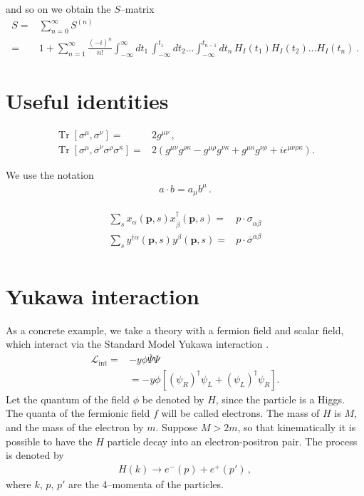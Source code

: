 and so on we obtain the $S$--matrix
\begin{align}
  S=&\sum_{n=0}^\infty S^{(n)}\nonumber\\
  =&1+\sum_{n=1}^\infty\frac{(-i)^n}{n!}\int_{-\infty}^{\infty}d t_1\,\int_{-\infty}^{t_1} d t_2\ldots\int_{-\infty}^{t_{n-1}}d t_n\,{H}_I(t_1){H}_I(t_2)\ldots{H}_I(t_n)\,.
\end{align}

\section{Useful identities}
\begin{align} %
  \label{eq:trss}
  \operatorname{Tr}\left[ \sigma^{\mu},\sigma^{\nu} \right]=&2 g^{\mu\nu}\,, \\
  \operatorname{Tr}\left[ \sigma^{\mu},\overline{\sigma}^{\nu}\sigma^{\rho}\sigma^{\kappa} \right]=&
   2 \left(g^{\mu\nu}g^{\rho\kappa}-g^{\mu\rho}g^{\nu\kappa}+g^{\mu\kappa}g^{\nu\rho} +i\epsilon^{\mu\nu\rho\kappa} \right).
\end{align}


We use the notation
\begin{align}
  a\cdot b=a_{\mu}b^{\mu}\,.
\end{align}

\begin{align}
\label{eq:xxd}
  \sum_s x_{\alpha}(\mathbf{p},s)x^{\dagger}_{\dot{\beta}}(\mathbf{p},s)=&p\cdot \sigma_{\alpha\dot{\beta}} \nonumber\\
   \sum_s y^{\dagger \dot{\alpha}}(\mathbf{p},s) y^{\beta}(\mathbf{p},s)=&p\cdot \overline{\sigma}^{\dot{\alpha}\beta} \nonumber\\
\end{align}



\section{Yukawa interaction}
\label{sec:feynman-diagrams}
As a concrete example, we take a theory with a fermion field and scalar field, which interact via the Standard Model Yukawa interaction \cite{Lahiri:2005sm}. 
\begin{align}
\label{eq:lppp}
  \mathcal{L}_{\text{int}}=&-y\phi\overline{\Psi}\Psi \nonumber\\
&=-y \phi \left[\left( \psi_R \right)^{\dagger}\psi_L+\left(\psi_L \right)^{\dagger}\psi_R  \right].
\end{align}
Let the quantum of the field $\phi$ be denoted by $H$, since the particle is a Higgs. The quanta of the fermionic field $f$ will be called electrons. The mass of $H$ is $M$, and the mass of the electron by $m$. Suppose $M\gt 2m$,  so that kinematically it is possible to have the $H$ particle decay into an electron-positron pair. The process is denoted by
\begin{align}
  H(k)\to e^-(p)+e^+(p')\,,
\end{align}
where $k$, $p$, $p'$ are the 4--momenta of the particles.


